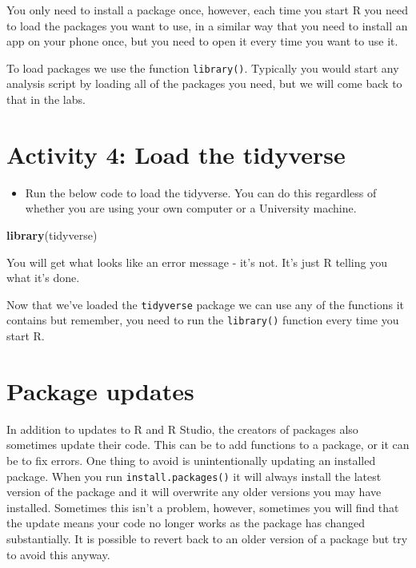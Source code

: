 \documentclass[
]{book}
\newenvironment{Shaded}{\begin{snugshade}}{\end{snugshade}}
\newcommand{\FunctionTok}[1]{\textcolor[rgb]{0.13,0.29,0.53}{\textbf{#1}}}
\newcommand{\NormalTok}[1]{#1}
\providecommand{\tightlist}{%
  \setlength{\itemsep}{0pt}\setlength{\parskip}{0pt}}
\begin{document}
You only need to install a package once, however, each time you start R you need to load the packages you want to use, in a similar way that you need to install an app on your phone once, but you need to open it every time you want to use it.

To load packages we use the function \texttt{library()}. Typically you would start any analysis script by loading all of the packages you need, but we will come back to that in the labs.

\section{Activity 4: Load the tidyverse}\label{activity-4-load-the-tidyverse}

\begin{itemize}
\tightlist
\item
  Run the below code to load the tidyverse. You can do this regardless of whether you are using your own computer or a University machine.
\end{itemize}

\begin{Shaded}
\begin{Highlighting}[]
\FunctionTok{library}\NormalTok{(tidyverse)}
\end{Highlighting}
\end{Shaded}

You will get what looks like an error message - it's not. It's just R telling you what it's done.

Now that we've loaded the \texttt{tidyverse} package we can use any of the functions it contains but remember, you need to run the \texttt{library()} function every time you start R.

\section{Package updates}\label{package-updates}

In addition to updates to R and R Studio, the creators of packages also sometimes update their code. This can be to add functions to a package, or it can be to fix errors. One thing to avoid is unintentionally updating an installed package. When you run \texttt{install.packages()} it will always install the latest version of the package and it will overwrite any older versions you may have installed. Sometimes this isn't a problem, however, sometimes you will find that the update means your code no longer works as the package has changed substantially. It is possible to revert back to an older version of a package but try to avoid this anyway.
\end{document}
